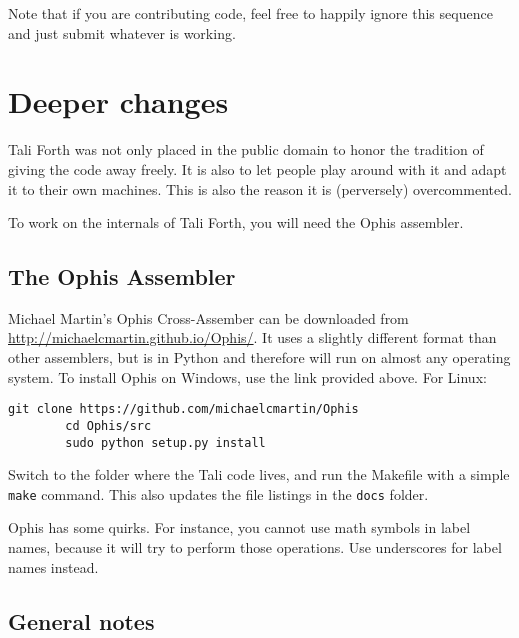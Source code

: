 Note that if you are contributing code, feel free to happily ignore this
sequence and just submit whatever is working. 

\section{Deeper changes}

Tali Forth was not only placed in the public domain to honor the tradition of
giving the code away freely. It is also to let people play around with it and
adapt it to their own machines. This is also the reason it is (perversely)
overcommented.

To work on the internals of Tali Forth, you will need the Ophis assembler.

\subsection{The Ophis Assembler}

Michael Martin's Ophis Cross-Assember can be downloaded from
\href{http://michaelcmartin.github.io/Ophis/}{http://michaelcmartin.github.io/Ophis/}.
It uses a slightly different format than other assemblers, but is in
Python and
therefore will run on almost any operating system. To install Ophis on Windows,
use the link provided above. For Linux:

\begin{lstlisting}[frame=lines]
        git clone https://github.com/michaelcmartin/Ophis
        cd Ophis/src
        sudo python setup.py install
\end{lstlisting}

Switch to the folder where the Tali code lives, and run the Makefile with a
simple \texttt{make} command. This also updates the file listings in the
\texttt{docs} folder. 

Ophis has some quirks. For instance, you cannot use math symbols in label names,
because it will try to perform those operations. Use underscores for label names
instead.

\subsection{General notes}


